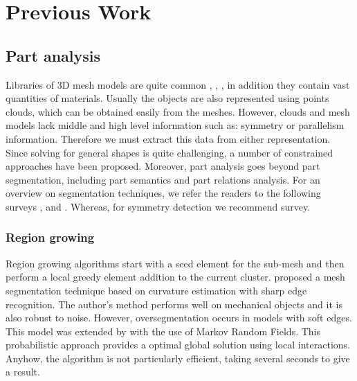 \chapter{Previous Work}
\label{ch:prevWork}

\section{Part analysis}
\label{sec:partAnalysis}

Libraries of 3D mesh models are quite common \cite{Trimble2014}, \cite{GrabCAD2014}, \cite{Autodesk2014}, in addition they contain vast quantities of materials.   
Usually the objects are also represented using points clouds, which can be obtained easily from the meshes.
However, clouds and mesh models lack middle and high level information such as: symmetry or parallelism information.
Therefore we must extract this data from either representation.
Since solving for general shapes is quite challenging, a number of constrained approaches have been proposed.
Moreover, part analysis goes beyond part segmentation, including part semantics and part relations analysis. 
For an overview on segmentation techniques, we refer the readers to the following surveys \cite{Varady1997}, \cite{Agathos2007} and \cite{Shamir2008}.
Whereas, for symmetry detection we recommend \cite{Mitra2013} survey.

\subsection{Region growing}

Region growing algorithms start with a seed element for the sub-mesh and then perform a local greedy element addition to the current cluster.
\cite{Mizoguchi2006} proposed a mesh segmentation technique based on curvature estimation with sharp edge recognition.
The author's method performs well on mechanical objects and it is also robust to noise.
However, oversegmentation occurs in models with soft edges.
This model was extended by \cite{Lavoue2008} with the use of Markov Random Fields.
This probabilistic approach provides a optimal global solution using local interactions.
Anyhow, the algorithm is not particularly efficient, taking several seconds to give a result.



